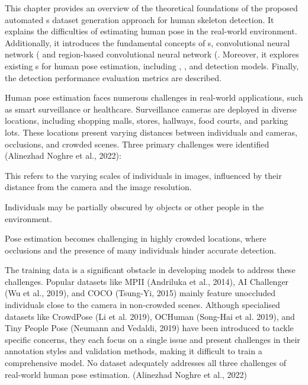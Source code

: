 This chapter provides an overview of the theoretical foundations of the proposed automated \NN\-s dataset generation approach for human skeleton detection. It explains the difficulties of estimating human pose in the real-world environment. Additionally, it introduces the fundamental concepts of \NN\-s, convolutional neural network (\CNN\) and region-based convolutional neural network (\RCNN\). Moreover, it explores existing \NN\-s for human pose estimation, including , , and  detection models. Finally, the detection performance evaluation metrics are described.

Human pose estimation faces numerous challenges in real-world applications, such as smart surveillance or healthcare. Surveillance cameras are de\-ployed in diverse locations, including shopping malls, stores, hallways, food courts, and parking lots. These locations present varying distances between individuals and cameras, occlusions, and crowded scenes. Three primary challenges were identified (\scc Alinezhad Noghre et al., 2022):

\startitemize[n]
 \item {} This refers to the varying scales of individuals in images, influenced by their distance from the camera and the image resolution.
 \item {} Individuals may be partially obscured by objects or other people in the environment.
 \item {} Pose estimation becomes challenging in highly crowd\-ed locations, where occlusions and the presence of many individuals hinder accurate detection.
\stopitemize

The training data is a significant obstacle in developing models to address these challenges. Popular datasets like MPII (\scc Andriluka et al., 2014), AI Challenger (\scc Wu et al., 2019), and COCO (\scc Tsung-Yi, 2015) mainly feature unoccluded individuals close to the camera in non-crowded scenes. Although specialised datasets like CrowdPose (\scc Li et al. 2019), OCHuman (\scc Song-Hai et al. 2019), and Tiny People Pose (\scc Neumann and Vedaldi, 2019) have been introduced to tackle specific concerns, they each focus on a single issue and present challenges in their annotation styles and validation methods, making it difficult to train a comprehensive model. No dataset adequately addresses all three challenges of real-world human pose estimation. (\scc Alinezhad Noghre et al., 2022)

